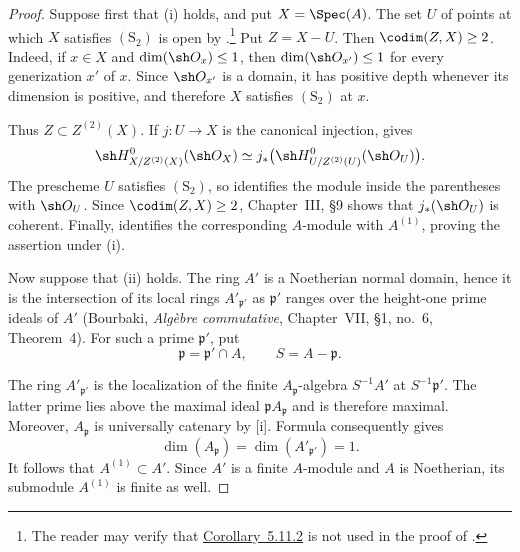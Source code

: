 \begin{proof}
Suppose first that {\rm(i)} holds, and put $X=\Spec(A)$.  The set
$U$ of points at which $X$ satisfies $(\mathrm S_2)$ is open by
.\footnote{The reader may verify that
{\hyperlink{ega4.c04.cor.5-11-2}{Corollary~5.11.2}} is not used in the proof of
.}
Put $Z=X-U$.  Then $\codim(Z,X)\geq2$.  Indeed, if
$x\in X$ and $\dim(\sh O_x)\leq1$, then
$\dim(\sh O_{x'})\leq1$ for every generization $x'$ of $x$.
Since $\sh O_{x'}$ is a domain, it has positive depth whenever
its dimension is positive, and therefore $X$ satisfies
$(\mathrm S_2)$ at $x$.

Thus $Z\subset Z^{(2)}(X)$.  If $j:U\to X$ is the canonical
injection,  gives
\[
  \sh H^0_{X/Z^{(2)}(X)}(\sh O_X)
  \simeq
  j_*\bigl(
    \sh H^0_{U/Z^{(2)}(U)}(\sh O_U)
  \bigr).
\]
The prescheme $U$ satisfies $(\mathrm S_2)$, so
 identifies the module inside the parentheses
with $\sh O_U$.  Since $\codim(Z,X)\geq2$, Chapter~III,
\S9 shows that $j_*(\sh O_U)$ is coherent.  Finally,
 identifies the corresponding $A$-module with
$A^{(1)}$, proving the assertion under {\rm(i)}.

Now suppose that {\rm(ii)} holds.  The ring $A'$ is a Noetherian
normal domain, hence it is the intersection of its local rings
$A'_{\mathfrak p'}$ as $\mathfrak p'$ ranges over the
height-one prime ideals of $A'$
(Bourbaki, \emph{Alg\`ebre commutative}, Chapter~VII,
\S1, no.~6, Theorem~4).  For such a prime $\mathfrak p'$, put
\[
  \mathfrak p=\mathfrak p'\cap A,
  \qquad
  S=A-\mathfrak p.
\]


The ring $A'_{\mathfrak p'}$ is the localization of the finite
$A_{\mathfrak p}$-algebra $S^{-1}A'$ at
$S^{-1}\mathfrak p'$.  The latter prime lies above the maximal
ideal $\mathfrak pA_{\mathfrak p}$ and is therefore maximal.
Moreover, $A_{\mathfrak p}$ is universally catenary by
[i].  Formula  consequently gives
\[
  \dim(A_{\mathfrak p})
  =\dim(A'_{\mathfrak p'})
  =1.
\]
It follows that $A^{(1)}\subset A'$.  Since $A'$ is a finite
$A$-module and $A$ is Noetherian, its submodule $A^{(1)}$ is
finite as well.
\end{proof}

